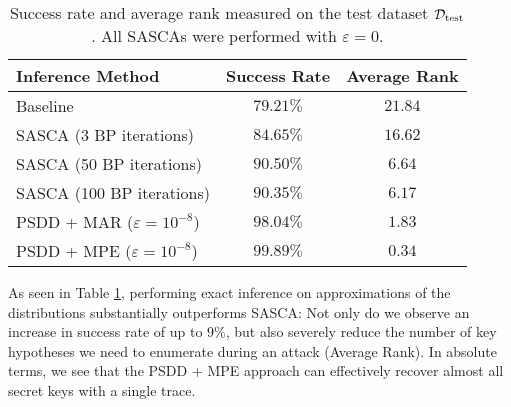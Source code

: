 \begin{table}[H]
    \centering
	\begin{tabular}{|l | c | c|}
		\hline
		\textbf{Inference Method} & \textbf{Success Rate} & \textbf{Average Rank} \\
	\hline %
		Baseline & $79.21 \%$ & $21.84$ \\ \hline
		SASCA (3 BP iterations) & $84.65 \%$ & $16.62$ \\ \hline
		SASCA (50 BP iterations) & $90.50 \%$ & $6.64$ \\ \hline
		SASCA (100 BP iterations) & $90.35 \%$ & $6.17$ \\ \hline
		PSDD + MAR ($\varepsilon=10^{-8}$) & $98.04 \%$ & $1.83$ \\ \hline
		PSDD + MPE ($\varepsilon=10^{-8}$) & $\mathbf{99.89} \%$ & $\mathbf{0.34}$ \\ \hline
	\end{tabular}
	\caption{Success rate and average rank measured on the test dataset $\mathcal{D}_{\text{test}}$. All SASCAs were performed with $\varepsilon = 0$.}
    \label{tab:test_res}
\end{table}

As seen in Table \ref{tab:test_res}, performing exact inference on approximations of the distributions substantially outperforms SASCA: Not only do we observe an increase in success rate of up to $9\%$, but also severely reduce the number of key hypotheses we need to enumerate during an attack (Average Rank). In absolute terms, we see that the PSDD + MPE approach can effectively recover almost all secret keys with a single trace.




